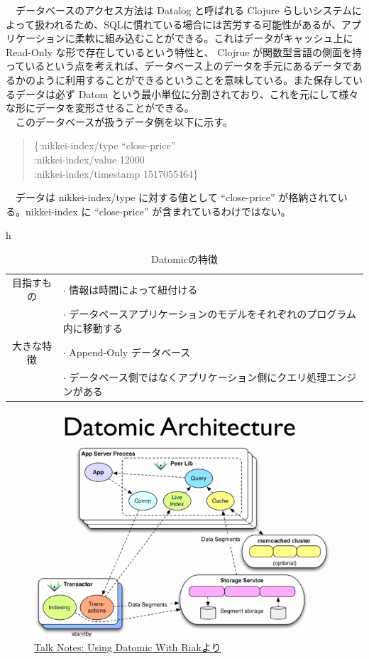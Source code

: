 \documentclass[dvipdfmx]{scrartcl}
\begin{document}
　データベースのアクセス方法は Datalog と呼ばれる Clojure らしいシステムによって扱われるため、SQLに慣れている場合には苦労する可能性があるが、アプリケーションに柔軟に組み込むことができる。これはデータがキャッシュ上に Read-Only な形で存在しているという特性と、 Clojrue が関数型言語の側面を持っているという点を考えれば、データベース上のデータを手元にあるデータであるかのように利用することができるということを意味している。また保存しているデータは必ず Datom という最小単位に分割されており、これを元にして様々な形にデータを変形させることができる。\\
　このデータベースが扱うデータ例を以下に示す。\\

\begin{verse}
\{:nikkei-index/type ``close-price''\\
\hspace*{1em}:nikkei-index/value 12000\\
\hspace*{1em}:nikkei-index/timestamp 1517055464\}\\
\end{verse}
　データは nikkei-index/type に対する値として ``close-price'' が格納されている。nikkei-index に ``close-price'' が含まれているわけではない。\\

\begin{table}{h}
\caption{Datomicの特徴}
\centering
\begin{tabular}{|c|l|}
\hline
目指すもの & \(\cdot\) 情報は時間によって紐付ける\\
 & \(\cdot\) データベースアプリケーションのモデルをそれぞれのプログラム内に移動する\\
\hline
大きな特徴 & \(\cdot\) Append-Only データベース\\
 & \(\cdot\) データベース側ではなくアプリケーション側にクエリ処理エンジンがある\\
\hline
\end{tabular}
\end{table}

\begin{figure}[htbp]
\centering
\includegraphics[width=15cm]{./datomic.png}
\caption{\href{http://endot.org/notes/2014-01-10-using-datomic-with-riak/datomic.png}{Talk Notes: Using Datomic With Riakより}}
\end{figure}
\end{document}
